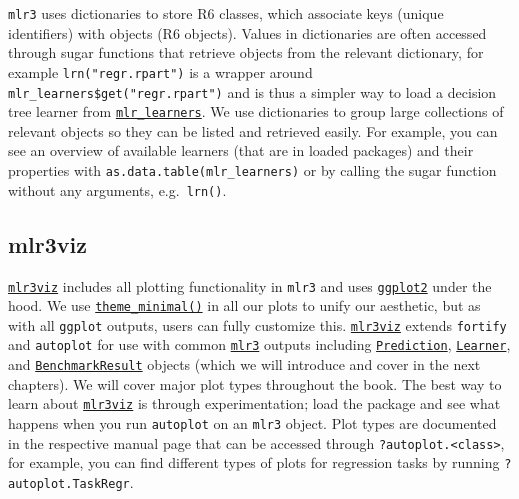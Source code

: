 \texttt{mlr3} uses dictionaries to store R6 classes,
which associate keys (unique identifiers) with objects (R6 objects).
Values in dictionaries are often accessed through sugar functions that
retrieve objects from the relevant dictionary, for example
\texttt{lrn("regr.rpart")} is a wrapper around
\texttt{mlr\_learners\$get("regr.rpart")} and is thus a simpler way to
load a decision tree learner from
\href{https://mlr3.mlr-org.com/reference/mlr_learners.html}{\texttt{mlr\_learners}}.
We use dictionaries to group large collections of relevant objects so
they can be listed and retrieved easily. For example, you can see an
overview of available learners (that are in loaded packages) and their
properties with \texttt{as.data.table(mlr\_learners)} or by calling the
sugar function without any arguments, e.g.~\texttt{lrn()}.

\hypertarget{mlr3viz}{%
\subsection*{mlr3viz}\label{mlr3viz}}

\href{https://mlr3viz.mlr-org.com}{\texttt{mlr3viz}}
includes all plotting functionality in \texttt{mlr3} and uses
\href{https://cran.r-project.org/package=ggplot2}{\texttt{ggplot2}}
under the hood. We use
\href{https://www.rdocumentation.org/packages/ggplot2/topics/theme_minimal}{\texttt{theme\_minimal()}}
in all our plots to unify our aesthetic, but as with all \texttt{ggplot}
outputs, users can fully customize this.
\href{https://mlr3viz.mlr-org.com}{\texttt{mlr3viz}}
extends \texttt{fortify} and \texttt{autoplot} for use with common
\href{https://mlr3.mlr-org.com}{\texttt{mlr3}}
outputs including
\href{https://mlr3.mlr-org.com/reference/Prediction.html}{\texttt{Prediction}},
\href{https://mlr3.mlr-org.com/reference/Learner.html}{\texttt{Learner}},
and
\href{https://mlr3.mlr-org.com/reference/BenchmarkResult.html}{\texttt{BenchmarkResult}}
objects (which we will introduce and cover in the next chapters). We
will cover major plot types throughout the book. The best way to learn
about
\href{https://mlr3viz.mlr-org.com}{\texttt{mlr3viz}}
is through experimentation; load the package and see what happens when
you run \texttt{autoplot} on an \texttt{mlr3} object. Plot types are
documented in the respective manual page that can be accessed through
\texttt{?autoplot.\textless{}class\textgreater{}}, for example, you can
find different types of plots for regression tasks by running
\texttt{?autoplot.TaskRegr}.

